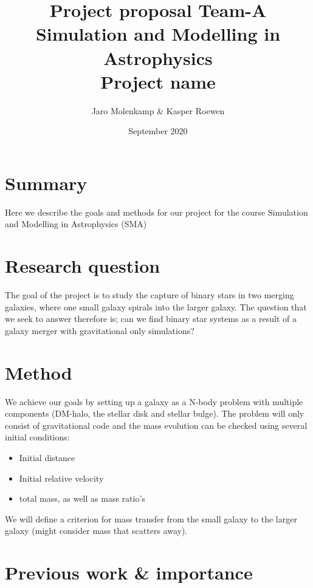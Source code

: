 \documentclass{article}
\title{Project proposal Team-A\\ Simulation and Modelling in Astrophysics\\ Project name}
\author{Jaro Molenkamp \& Kasper Roewen }
\date{September 2020}
\begin{document}
\maketitle

\section{Summary}%
Here we describe the goals and methods for our project for the course Simulation and Modelling in Astrophysics (SMA)

\section{Research question}%
The goal of the project is to study the capture of binary stars in two merging galaxies, where one small galaxy spirals into the larger galaxy. The question that we seek to answer therefore is; can we find binary star systems as a result of a galaxy merger with gravitational only simulations?

\section{Method}%
We achieve our goals by setting up a galaxy as a N-body problem with multiple components (DM-halo, the stellar disk and stellar bulge). The problem will only consist of gravitational code and the mass evolution can be checked using several initial conditions:
\begin{itemize}
    \item Initial distance
    \item Initial relative velocity
    \item total mass, as well as mass ratio's
\end{itemize}

We will define a criterion for mass transfer from the small galaxy to the larger galaxy (might consider mass that scatters away). 

\section{Previous work \& importance}%


\end{document}
